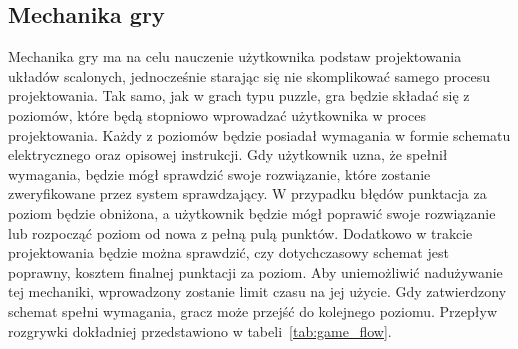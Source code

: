 
\subsection{Mechanika gry}
\label{subsec:mechanika_gry}

Mechanika gry ma na celu nauczenie użytkownika podstaw projektowania układów scalonych,
jednocześnie starając się nie skomplikować samego procesu projektowania.
Tak samo, jak w grach typu puzzle, gra będzie składać się z poziomów,
które będą stopniowo wprowadzać użytkownika w proces projektowania.
Każdy z poziomów będzie posiadał wymagania w formie schematu elektrycznego oraz opisowej instrukcji.
Gdy użytkownik uzna, że spełnił wymagania, będzie mógł sprawdzić swoje rozwiązanie,
które zostanie zweryfikowane przez system sprawdzający.
W przypadku błędów punktacja za poziom będzie obniżona,
a użytkownik będzie mógł poprawić swoje rozwiązanie lub rozpocząć poziom od nowa z pełną pulą punktów.
Dodatkowo w trakcie projektowania będzie można sprawdzić, czy dotychczasowy schemat jest poprawny,
kosztem finalnej punktacji za poziom.
Aby uniemożliwić nadużywanie tej mechaniki, wprowadzony zostanie limit czasu na jej użycie.
Gdy zatwierdzony schemat spełni wymagania, gracz może przejść do kolejnego poziomu.
Przepływ rozgrywki dokładniej przedstawiono w tabeli~\ref{tab:game_flow}.

